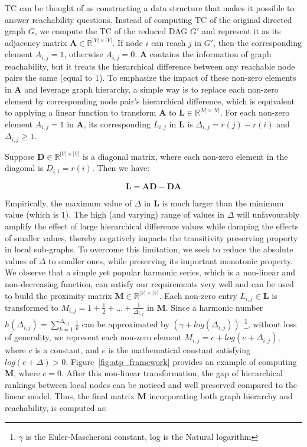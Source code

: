 \documentclass[letterpaper]{article} \usepackage{aaai19}  \usepackage{times}  \usepackage{helvet}  \usepackage{courier}  \usepackage{url}  \usepackage{graphicx}  \usepackage{booktabs} \usepackage{xcolor}
\begin{document}
TC can be thought of as constructing a data structure that makes it possible to answer reachability questions. Instead of computing TC of the original directed graph $G$, we compute the TC of the reduced DAG $G'$ and represent it as its adjacency matrix $\boldsymbol{A} \in \mathbb{R}^{|V| \times |V|}$. If node $i$ can reach $j$ in $G'$, then the corresponding element $A_{i,j} = 1$, otherwise $A_{i,j} = 0$.
$\boldsymbol{A}$ contains the information of graph reachability, but it treats the hierarchical difference between any reachable node pairs the same (equal to $1$). To emphasize the impact of these non-zero elements in $\boldsymbol{A}$ and leverage graph hierarchy, a simple way is to replace each non-zero element by corresponding node pair's hierarchical difference, which is equivalent to applying a linear function to transform $\boldsymbol{A}$ to $\boldsymbol{L} \in \mathbb{R}^{|V| \times |V|}$. For each non-zero element $A_{i,j} = 1$ in $\boldsymbol{A}$, its corresponding $L_{i,j}$ in $\boldsymbol{L}$ is $\Delta_{i,j} = r(j) - r(i)$ and $\Delta_{i,j} \geq 1$.   


Suppose $\boldsymbol{D} \in \mathbb{R}^{|V| \times |V|}$ is a diagonal matrix, where each non-zero element in the diagonal is $D_{i,i} = r(i)$. Then we have:


\begin{equation}
    \boldsymbol{L} = \boldsymbol{AD} - \boldsymbol{DA}
    \label{eq:linear}
\end{equation}

Empirically, the maximum value of $\Delta$ in $\boldsymbol{L}$ is much larger than the minimum value (which is $1$). The high (and varying) range of values in $\Delta$ will unfavourably amplify the effect of large hierarchical difference values while damping the effects of smaller values, thereby negatively impacts the transitivity preserving property in local sub-graphs.
To overcome this limitation, we seek to reduce the absolute values of $\Delta$ to smaller ones, while preserving its important monotonic property.
We observe that a simple yet popular harmonic series, which is a non-linear and non-decreasing function, can satisfy our requirements very well and can be used to build the proximity matrix $\boldsymbol{M} \in \mathbb{R}^{|V| \times |V|}$.
Each non-zero entry $L_{i,j} \in \boldsymbol{L}$ is transformed to $M_{i,j} =  1+\frac{1}{2}+...+\frac{1}{\Delta_{i,j}}$ in $\boldsymbol{M}$. Since a harmonic number $h(\Delta_{i,j}) = \sum_{k=1}^{\Delta_{i,j}} \frac{1}{k}$ can be approximated by $(\gamma + log(\Delta_{i,j}))$~\footnote{$\gamma$ is the Euler-Mascheroni constant, log is the Natural logarithm}, without loss of generality, we represent each non-zero element $M_{i,j} = c + log(e + \Delta_{i,j})$, where $c$ is a constant, and $e$ is the  mathematical constant satisfying $log(e + \Delta) > 0$.
Figure~\ref{fig:atp_framework} provides an example of computing $\boldsymbol{M}$, where $c = 0$.
After this non-linear transformation, the gap of hierarchical rankings between local nodes can be noticed and well preserved compared to the linear model. Thus, the final matrix $\boldsymbol{M}$ incorporating both graph hierarchy and reachability, 
is computed as:
\end{document}
